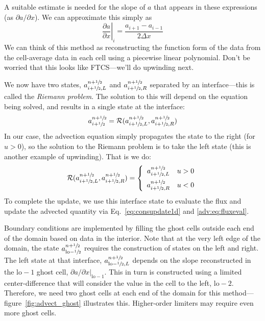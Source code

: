 A suitable estimate is needed for the slope of $a$ that appears in
these expressions (as $\partial a/\partial x$).  We can approximate
this simply as
\begin{equation}
\left . \frac{\partial a}{\partial x}\right |_i = \frac{a_{i+1} - a_{i-1}}{2 \Delta x} \label{eq:slopecentered}
\end{equation}
We can think of this method as reconstructing the function form of the
data from the cell-average data in each cell using a piecewise linear
polynomial.  Don't be worried that this looks like FTCS---we'll do
upwinding next.


We now have two states, $a_{i+{\sfrac{1}{2}},L}^{n+{\sfrac{1}{2}}}$ and
$a_{i+{\sfrac{1}{2}},R}^{n+{\sfrac{1}{2}}}$ separated by an interface---this is
called the {\em Riemann problem}.
%
The solution to this will depend on the equation being solved, and
results in a single state at the interface:
\begin{equation}
a_{i+{\sfrac{1}{2}}}^{n+{\sfrac{1}{2}}} = \mathcal{R}(a_{i+{\sfrac{1}{2}},L}^{n+{\sfrac{1}{2}}},a_{i+{\sfrac{1}{2}},R}^{n+{\sfrac{1}{2}}})
\end{equation}
In our case, the advection equation simply propagates the state to the
right (for $u > 0$), so the solution to the Riemann problem is to take
the left state (this is another example of upwinding).  That is we do:
\begin{equation}
\mathcal{R}(a_{i+{\sfrac{1}{2}},L}^{n+{\sfrac{1}{2}}},a_{i+{\sfrac{1}{2}},R}^{n+{\sfrac{1}{2}}}) = \left \{ \begin{array}{ccc} a_{i+{\sfrac{1}{2}},L}^{n+{\sfrac{1}{2}}} & u > 0 \\[2mm] a_{i+{\sfrac{1}{2}},R}^{n+{\sfrac{1}{2}}} & u < 0 \end{array} \right .
\label{eq:riemannsolve}
\end{equation}
To complete the update, we use this interface state to evaluate the
flux and update the advected quantity via Eq.~\ref{eq:consupdate1d}
and \ref{adv:eq:fluxeval}.

Boundary conditions are implemented by filling the ghost cells outside
each end of the domain based on data in the interior.  Note that at
the very left edge of the domain, the state
$a^{n+{\sfrac{1}{2}}}_{\mathrm{lo}-{\sfrac{1}{2}}}$ requires the construction of states on
the left and right.  The left state at that interface,
$a^{n+{\sfrac{1}{2}}}_{\mathrm{lo}-{\sfrac{1}{2}},L}$ depends on the slope reconstructed in
the $\mathrm{lo}-1$ ghost cell, $\partial a/\partial x
|_{\mathrm{lo}-1}$.  This in turn is constructed using a limited
center-difference that will consider the value in the cell to the
left, $\mathrm{lo-2}$.  Therefore, we need two ghost cells at each end
of the domain for this method---figure~\ref{fig:advect_ghost}
illustrates this.  Higher-order limiters may require even more ghost
cells.

